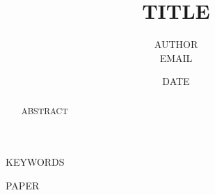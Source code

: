 \documentclass{IEEEtran}
\title{~TITLE~}
\author{ ~AUTHOR~  \\ ~EMAIL~}
\date{ ~DATE~ }
\begin{document}
\maketitle

\begin{abstract}
~ABSTRACT~
\end{abstract}

\begin{IEEEkeywords}
~KEYWORDS~
\end{IEEEkeywords}

~PAPER~

\printbibliography
\end{document}
